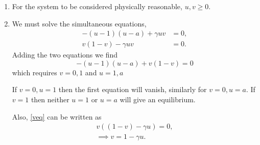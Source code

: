 \documentclass[a4paper, 12pt]{article}
\begin{document}
\begin{enumerate}[label={\bf \arabic{*}.\;}, ref={\arabic{*}},itemsep=3ex, left=0ex]
{      \begin{enumerate}[label=(\alph*)]
        \item{For the system to be considered physically reasonable, $u,v\geq0$.}
        \item{We must solve the simultaneous equations,
            \begin{subequations}
              \begin{align}
                \label{ueq}-(u-1)(u-a) + \gamma u v&=0,\\
                \label{veq}v(1-v) -\gamma uv &=0.
              \end{align}
            \end{subequations}
            Adding the two equations we find
            \begin{equation}
              -(u-1)(u-a)+ v(1-v) = 0
            \end{equation}
            which requires $v=0,1$ and $u=1,a$

            If $v=0,u=1$ then the first equation will vanish, similarly for $v=0,u=a$. If $v=1$ then neither $u=1$ or $u=a$ will give an equilibrium.

            Also, \cref{veq} can be written as
            \begin{align}
              v((1-v) - \gamma u)=0,\\
              \label{vsol}\implies v=1- \gamma u.
            \end{align}

}
\end{enumerate}}
\end{enumerate}
\end{document}
